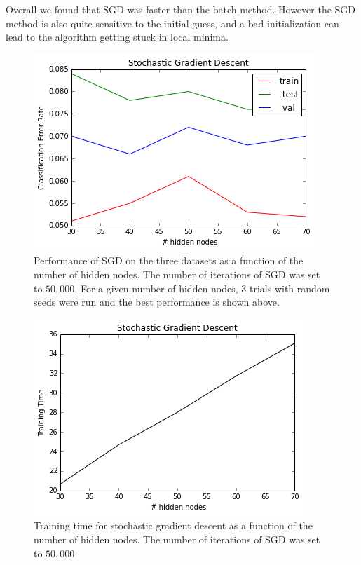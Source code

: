\documentclass[10pt]{article}
\begin{document}
Overall we found that SGD was faster than the batch method. However the SGD method is also quite sensitive to the initial guess, and a bad initialization can lead to the algorithm getting stuck in local minima. 



\begin{figure}
\centering
\includegraphics[scale=0.5]{SGD_mnist_CER_hidden_nodes.png}
\caption{Performance of SGD on the three datasets as a function of the number of hidden nodes. The number of iterations of SGD was set to $50,000$. For a given number of hidden nodes, 3 trials with random seeds were run and the best performance is shown above.}
\label{SGD_mnist_CER_hidden_nodes}
\end{figure}

\begin{figure}
\centering
\includegraphics[scale=0.5]{SGD_mnist_training_time_hidden_nodes.png}
\caption{Training time for stochastic gradient descent as a function of the number of hidden nodes. The number of iterations of SGD was set to $50,000$}
\label{SGD_mnist_training_time_hidden_nodes}
\end{figure}
\end{document}
